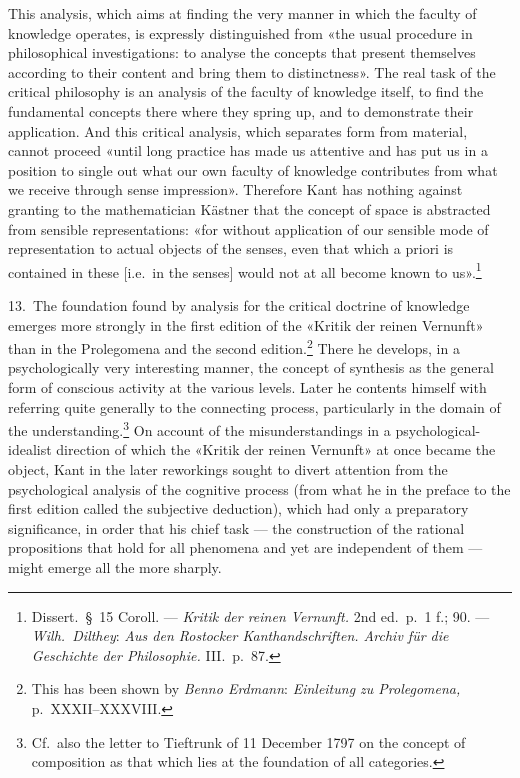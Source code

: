 \documentclass[12pt,a4paper]{article}
\begin{document}
This analysis, which aims at finding the very manner in which the faculty of
knowledge operates, is expressly distinguished from «the usual procedure in
philosophical investigations: to analyse the concepts that present
themselves according to their content and bring them to distinctness». The
real task of the critical philosophy is an analysis of the faculty of
knowledge itself, to find the fundamental concepts there where they spring
up, and to demonstrate their application. And this critical analysis, which
separates form from material, cannot proceed «until long practice has made
us attentive and has put us in a position to single out what our own
faculty of knowledge contributes from what we receive through sense
impression». Therefore Kant has nothing against granting to the
mathematician Kästner that the concept of space is abstracted from sensible
representations: «for without application of our sensible mode of
representation to actual objects of the senses, even that which a priori is
contained in these [i.e.\ in the senses] would not at all become known to
us».\footnote{Dissert.\ §\ 15 Coroll. --- \textit{Kritik der reinen
Vernunft.} 2nd ed.\ p.\ 1 f.; 90. --- \emph{Wilh.\ Dilthey}: \textit{Aus den
Rostocker Kanthandschriften. Archiv für die Geschichte der Philosophie.}
III.\ p.\ 87.}

13.\ The foundation found by analysis for the critical doctrine of
knowledge emerges more strongly in the first edition of the «Kritik der
reinen Vernunft» than in the Prolegomena and the second
edition.\footnote{This has been shown by \emph{Benno Erdmann}: \textit{Einleitung
zu Prolegomena,} p.\ XXXII--XXXVIII.} There he develops, in a
psychologically very interesting manner, the concept of synthesis as the
general form of conscious activity at the various levels. Later he contents
himself with referring quite generally to the connecting process,
particularly in the domain of the understanding.\footnote{Cf.\ also the
letter to Tieftrunk of 11 December 1797 on the concept of composition as
that which lies at the foundation of all categories.} On account of the
misunderstandings in a psychological-idealist direction of which the
«Kritik der reinen Vernunft» at once became the object, Kant in the later
reworkings sought to divert attention from the psychological analysis of
the cognitive process (from what he in the preface to the first edition
called the subjective deduction), which had only a preparatory
significance, in order that his chief task --- the construction of the
rational propositions that hold for all phenomena and yet are independent
of them --- might emerge all the more sharply.
\end{document}
